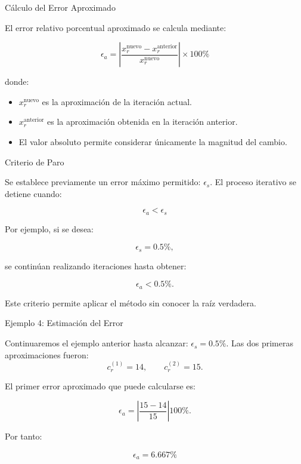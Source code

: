 \documentclass[../../main.tex]{subfiles}
\begin{document}

\begin{frame}{Cálculo del Error Aproximado}

El error relativo porcentual aproximado se calcula mediante:

\[
\boxed{
\epsilon_a
=
\left|
\frac{
x_r^{\text{nuevo}}
-
x_r^{\text{anterior}}
}{
x_r^{\text{nuevo}}
}
\right|
\times100\%
}
\]

donde:

\begin{itemize}

    \item \(x_r^{\text{nuevo}}\) es la aproximación de la iteración actual.

    \item \(x_r^{\text{anterior}}\) es la aproximación obtenida en la iteración anterior.

    \item El valor absoluto permite considerar únicamente la magnitud del cambio.

\end{itemize}

\end{frame}



\begin{frame}{Criterio de Paro}

Se establece previamente un error máximo permitido:
\(
\epsilon_s.
\)
El proceso iterativo se detiene cuando:

\[
\boxed{
\epsilon_a<\epsilon_s
}
\]

Por ejemplo, si se desea:

\[
\epsilon_s=0.5\%,
\]

se continúan realizando iteraciones hasta obtener:

\[
\epsilon_a<0.5\%.
\]

Este criterio permite aplicar el método sin conocer la raíz verdadera.

\end{frame}



\begin{frame}{Ejemplo 4: Estimación del Error}

Continuaremos el ejemplo anterior hasta alcanzar:
\(
\epsilon_s=0.5\%.
\)
Las dos primeras aproximaciones fueron:
\[
c_r^{(1)}=14,
\qquad
c_r^{(2)}=15.
\]

El primer error aproximado que puede calcularse es:

\[
\epsilon_a
=
\left|
\frac{15-14}{15}
\right|
100\%.
\]

Por tanto:

\[
\boxed{
\epsilon_a=6.667\%
}
\]

\end{frame}
\end{document}
